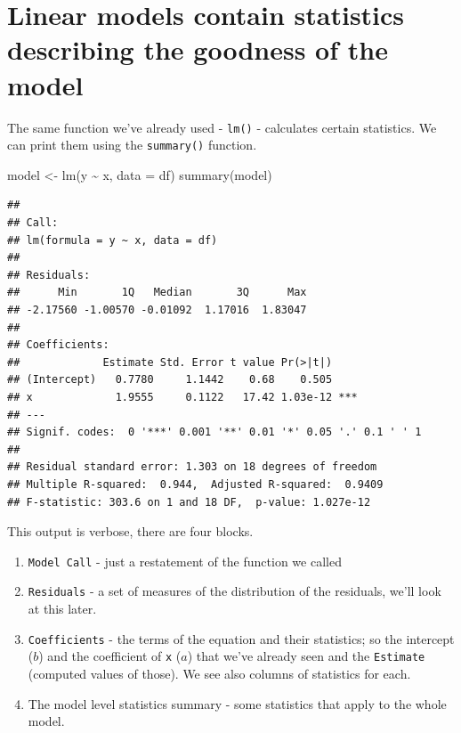 \documentclass[
]{book}
\newenvironment{Shaded}{\begin{snugshade}}{\end{snugshade}}
\newcommand{\AttributeTok}[1]{\textcolor[rgb]{0.77,0.63,0.00}{#1}}
\newcommand{\FunctionTok}[1]{\textcolor[rgb]{0.00,0.00,0.00}{#1}}
\newcommand{\NormalTok}[1]{#1}
\newcommand{\OtherTok}[1]{\textcolor[rgb]{0.56,0.35,0.01}{#1}}
\newcommand{\SpecialCharTok}[1]{\textcolor[rgb]{0.00,0.00,0.00}{#1}}
\providecommand{\tightlist}{%
  \setlength{\itemsep}{0pt}\setlength{\parskip}{0pt}}
\begin{document}
\hypertarget{linear-models-contain-statistics-describing-the-goodness-of-the-model}{%
\section{Linear models contain statistics describing the goodness of the model}\label{linear-models-contain-statistics-describing-the-goodness-of-the-model}}

The same function we've already used - \texttt{lm()} - calculates certain statistics. We can print them using the \texttt{summary()} function.

\begin{Shaded}
\begin{Highlighting}[]
\NormalTok{model }\OtherTok{\textless{}{-}} \FunctionTok{lm}\NormalTok{(y }\SpecialCharTok{\textasciitilde{}}\NormalTok{ x, }\AttributeTok{data =}\NormalTok{ df)}
\FunctionTok{summary}\NormalTok{(model)}
\end{Highlighting}
\end{Shaded}

\begin{verbatim}
## 
## Call:
## lm(formula = y ~ x, data = df)
## 
## Residuals:
##      Min       1Q   Median       3Q      Max 
## -2.17560 -1.00570 -0.01092  1.17016  1.83047 
## 
## Coefficients:
##             Estimate Std. Error t value Pr(>|t|)    
## (Intercept)   0.7780     1.1442    0.68    0.505    
## x             1.9555     0.1122   17.42 1.03e-12 ***
## ---
## Signif. codes:  0 '***' 0.001 '**' 0.01 '*' 0.05 '.' 0.1 ' ' 1
## 
## Residual standard error: 1.303 on 18 degrees of freedom
## Multiple R-squared:  0.944,	Adjusted R-squared:  0.9409 
## F-statistic: 303.6 on 1 and 18 DF,  p-value: 1.027e-12
\end{verbatim}

This output is verbose, there are four blocks.

\begin{enumerate}
\def\labelenumi{\arabic{enumi}.}
\tightlist
\item
  \texttt{Model\ Call} - just a restatement of the function we called
\item
  \texttt{Residuals} - a set of measures of the distribution of the residuals, we'll look at this later.
\item
  \texttt{Coefficients} - the terms of the equation and their statistics; so the intercept (\(b\)) and the coefficient of \texttt{x} (\(a\)) that we've already seen and the \texttt{Estimate} (computed values of those). We see also columns of statistics for each.
\item
  The model level statistics summary - some statistics that apply to the whole model.
\end{enumerate}
\end{document}
